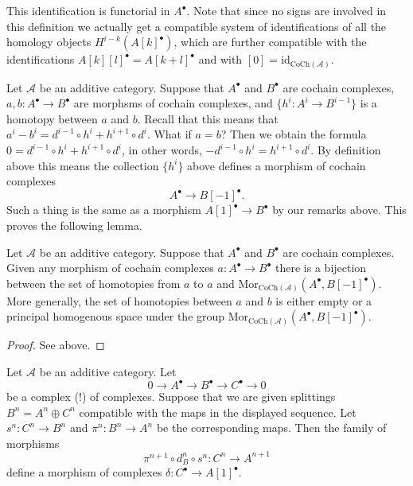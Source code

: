 \noindent
This identification is functorial in $A^\bullet$.
Note that since no signs are involved in this
definition we actually get a compatible system
of identifications of all the homology
objects $H^{i - k}(A[k]^\bullet)$, which are
further compatible with the identifications
$A[k][l]^\bullet = A[k + l]^\bullet$ and
with $[0] = \text{id}_{\text{CoCh}(\mathcal{A})}$.

\medskip\noindent
Let $\mathcal{A}$ be an additive category.
Suppose that $A^\bullet$ and $B^\bullet$ are
cochain complexes, $a, b : A^\bullet \to B^\bullet$ are
morphsms of cochain complexes, and $\{h^i : A^i \to B^{i - 1}\}$
is a homotopy between $a$ and $b$. Recall that this means
that
$a^i - b^i = d^{i - 1} \circ h^i + h^{i + 1} \circ d^i$.
What if $a = b$? Then we obtain the formula
$0 = d^{i - 1} \circ h^i + h^{i + 1} \circ d^i$,
in other words, $ - d^{i - 1} \circ h^i = h^{i + 1} \circ d^i$.
By definition above this means the collection $\{h^i\}$
above defines a morphism of cochain complexes
$$
A^\bullet \longrightarrow B[-1]^\bullet.
$$
Such a thing is the same as a morphism $A[1]^\bullet \to B^\bullet$
by our remarks above. This proves the following lemma.

\begin{lemma}
\label{lemma-homotopy-shift-cochain}
Let $\mathcal{A}$ be an additive category.
Suppose that $A^\bullet$ and $B^\bullet$ are
cochain complexes. Given any morphism of cochain
complexes $a : A^\bullet \to B^\bullet$ there
is a bijection between the set of homotopies
from $a$ to $a$ and
$\text{Mor}_{\text{CoCh}(\mathcal{A})}(A^\bullet, B[-1]^\bullet)$.
More generally, the set of homotopies between
$a$ and $b$ is either empty or a principal homogenous
space under the group
$\text{Mor}_{\text{CoCh}(\mathcal{A})}(A^\bullet, B[-1]^\bullet)$.
\end{lemma}

\begin{proof}
See above.
\end{proof}

\begin{lemma}
\label{lemma-ses-termwise-split-cochain}
Let $\mathcal{A}$ be an additive category.
Let
$$
0 \to A^\bullet \to B^\bullet \to C^\bullet \to 0
$$
be a complex (!) of complexes.
Suppose that we are given splittings $B^n = A^n \oplus C^n$
compatible with the maps in the displayed sequence.
Let $s^n : C^n \to B^n$ and $\pi^n : B^n \to A^n$ be the
corresponding maps. Then the family of morphisms
$$
\pi^{n + 1} \circ d_B^n \circ s^n
:
C^n \to A^{n + 1}
$$
define a morphism of complexes $\delta : C^\bullet \to A[1]^\bullet$.
\end{lemma}

